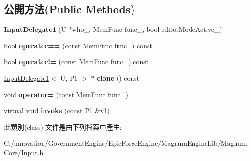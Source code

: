 \subsection*{公開方法(Public Methods)}
\begin{DoxyCompactItemize}
\item 
{\bfseries Input\+Delegate1} (U $\ast$who\+\_\+, Mem\+Func func\+\_\+, bool editor\+Mode\+Active\+\_\+)\hypertarget{class_i_dream_sky_1_1_input_1_1_input_delegate1_ac3a8cb96c97a9e90062dfad303c8072f}{}\label{class_i_dream_sky_1_1_input_1_1_input_delegate1_ac3a8cb96c97a9e90062dfad303c8072f}

\item 
bool {\bfseries operator==} (const Mem\+Func func\+\_\+) const \hypertarget{class_i_dream_sky_1_1_input_1_1_input_delegate1_a3c58404b612de1071a217ba4abe883e1}{}\label{class_i_dream_sky_1_1_input_1_1_input_delegate1_a3c58404b612de1071a217ba4abe883e1}

\item 
bool {\bfseries operator!=} (const Mem\+Func func\+\_\+) const \hypertarget{class_i_dream_sky_1_1_input_1_1_input_delegate1_aa3448347e0bb0a2041aa17a4e23144b8}{}\label{class_i_dream_sky_1_1_input_1_1_input_delegate1_aa3448347e0bb0a2041aa17a4e23144b8}

\item 
\hyperlink{class_i_dream_sky_1_1_input_1_1_input_delegate1}{Input\+Delegate1}$<$ U, P1 $>$ $\ast$ {\bfseries clone} () const \hypertarget{class_i_dream_sky_1_1_input_1_1_input_delegate1_a5508c0c25be08ec5b63e2008a634ab42}{}\label{class_i_dream_sky_1_1_input_1_1_input_delegate1_a5508c0c25be08ec5b63e2008a634ab42}

\item 
void {\bfseries operator=} (const Mem\+Func func\+\_\+)\hypertarget{class_i_dream_sky_1_1_input_1_1_input_delegate1_a83c31a10423a0525d3a4b35cacbf1cb2}{}\label{class_i_dream_sky_1_1_input_1_1_input_delegate1_a83c31a10423a0525d3a4b35cacbf1cb2}

\item 
virtual void {\bfseries invoke} (const P1 \&v1)\hypertarget{class_i_dream_sky_1_1_input_1_1_input_delegate1_ac6493644108fae0ab7d644a73c1cfc55}{}\label{class_i_dream_sky_1_1_input_1_1_input_delegate1_ac6493644108fae0ab7d644a73c1cfc55}

\end{DoxyCompactItemize}


此類別(class) 文件是由下列檔案中產生\+:\begin{DoxyCompactItemize}
\item 
C\+:/innovation/\+Government\+Engine/\+Epic\+Force\+Engine/\+Magnum\+Engine\+Lib/\+Magnum\+Core/Input.\+h\end{DoxyCompactItemize}
